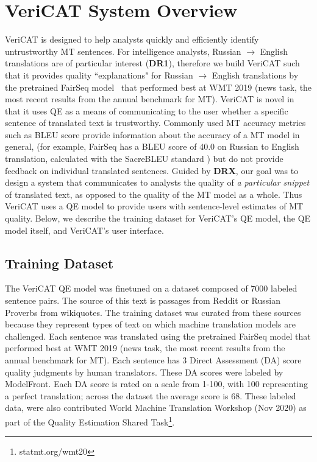 \section{VeriCAT System Overview}
VeriCAT is designed to help analysts quickly and efficiently identify untrustworthy MT sentences. For intelligence analysts, Russian $\rightarrow$ English translations are of particular interest (\textbf{DR1}), therefore we build VeriCAT such that it provides quality ``explanations" for Russian $\rightarrow$ English translations by the pretrained FairSeq model~\cite{ott-etal-2019-fairseq} that performed best at WMT 2019 (news task, the most recent results from the annual benchmark for MT).
VeriCAT is novel in that it uses QE as a means of communicating to the user whether a specific sentence of translated text is trustworthy. 
Commonly used MT accuracy metrics such as BLEU score \cite{papineni-etal-2002-bleu} provide information about the accuracy of a MT model in general, (for example, FairSeq has a BLEU score of 40.0 on Russian to English translation, calculated with the SacreBLEU standard \cite{post-2018-call}) but do not provide feedback on individual translated sentences.  
Guided by \textbf{DRX}, our goal was to design a system that communicates to analysts the quality of \textit{a particular snippet} of translated text, as opposed to the quality of the MT model as a whole. Thus VeriCAT uses a QE model to provide users with sentence-level estimates of MT quality.    
Below, we describe the training dataset for VeriCAT's QE model, the QE model itself, and VeriCAT's user interface.    

\subsection{Training Dataset}
The VeriCAT QE model was finetuned on a dataset composed of 7000 labeled sentence pairs. The source of this text is passages from Reddit or Russian Proverbs from wikiquotes. The training dataset was curated from these sources because they represent types of text on which machine translation models are challenged. Each sentence was translated using the pretrained FairSeq model \cite{ott-etal-2019-fairseq} that performed best at WMT 2019 (news task, the most recent results from the annual benchmark for MT). Each sentence has 3 Direct Assessment (DA) score quality judgments by human translators. These DA scores were labeled by ModelFront. Each DA score is rated on a scale from 1-100, with 100 representing a perfect translation; across the dataset the average score is 68. These labeled data, were also contributed World Machine Translation Workshop (Nov 2020) as part of the Quality Estimation Shared Task\footnote{statmt.org/wmt20}.  



